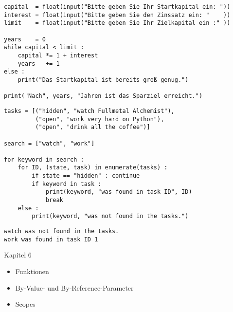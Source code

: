 \begin{frame}[fragile]
%
\begin{codebox}
\begin{verbatim}
capital  = float(input("Bitte geben Sie Ihr Startkapital ein: "))
interest = float(input("Bitte geben Sie den Zinssatz ein: "    ))
limit    = float(input("Bitte geben Sie Ihr Zielkapital ein :" ))

years    = 0
while capital < limit :
    capital *= 1 + interest
    years   += 1
else :
    print("Das Startkapital ist bereits groß genug.")
  
print("Nach", years, "Jahren ist das Sparziel erreicht.")
\end{verbatim}
\end{codebox}
%
\end{frame}


\begin{frame}[fragile]
%
\begin{codebox}
\begin{verbatim}
tasks = [("hidden", "watch Fullmetal Alchemist"),
         ("open", "work very hard on Python"),
         ("open", "drink all the coffee")]
         
search = ["watch", "work"]

for keyword in search :
    for ID, (state, task) in enumerate(tasks) :
        if state == "hidden" : continue
        if keyword in task :
            print(keyword, "was found in task ID", ID)
            break
    else :
        print(keyword, "was not found in the tasks.")
\end{verbatim}
\end{codebox}
%
\begin{cmdbox}
\begin{verbatim}
watch was not found in the tasks.
work was found in task ID 1
\end{verbatim}
\end{cmdbox}
%
\end{frame}


\begin{frame}[fragile]{Kapitel 6}
%
\begin{itemize}
\item Funktionen
\item By-Value- und By-Reference-Parameter
\item Scopes
\end{itemize}
%
\end{frame}

